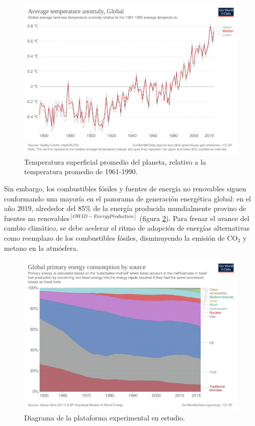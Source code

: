\begin{figure}[H]
    \centering
    \includegraphics[scale=0.11]{Imagenes/Grafico Temperatura.png}
    \caption{Temperatura superficial promedio del planeta, relativo a la temperatura promedio de 1961-1990.}
    \label{Temp_Tierra}
\end{figure}

Sin embargo, los combustibles fósiles y fuentes de energía no renovables siguen conformando una mayoría en el panorama de generación energética global: en el año 2019, alrededor del 85\% de la energía producida mundialmente provino de fuentes no renovables$^{[OWID-EnergyProduction]}$ (figura \ref{Emisiones_CO2}). Para frenar el avance del cambio climático, se debe acelerar el ritmo de adopción de energías alternativas como reemplazo de los combustibles fósiles, disminuyendo la emisión de CO$_2$ y metano en la atmósfera.

\begin{figure}[H]
    \centering
    \includegraphics[scale=0.11]{Imagenes/Grafico CO2.png}
    \caption{Diagrama de la plataforma experimental en estudio.}
    \label{Emisiones_CO2}
\end{figure}


